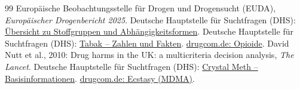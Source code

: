 \documentclass[11pt,a4paper]{article}
\begin{document}
\begin{thebibliography}{99}
		 Europäische Beobachtungsstelle für Drogen und Drogensucht (EUDA), \textit{Europäischer Drogenbericht 2025}.
		 Deutsche Hauptstelle für Suchtfragen (DHS): \href{https://www.dhs.de/suechte}{Übersicht zu Stoffgruppen und Abhängigkeitsformen}.
		 Deutsche Hauptstelle für Suchtfragen (DHS): \href{https://www.dhs.de/suechte/tabak}{Tabak – Zahlen und Fakten}.
		 \href{https://www.drugcom.de/drogen/opioide/}{drugcom.de: Opioide}.
		 David Nutt et al., 2010: Drug harms in the UK: a multicriteria decision analysis, \textit{The Lancet}.
		 Deutsche Hauptstelle für Suchtfragen (DHS): \href{https://www.dhs.de/suechte/crystal-meth}{Crystal Meth – Basisinformationen}.
		 \href{https://www.drugcom.de/drogen/ecstasy/}{drugcom.de: Ecstasy (MDMA)}.
	\end{thebibliography}
\end{document}
